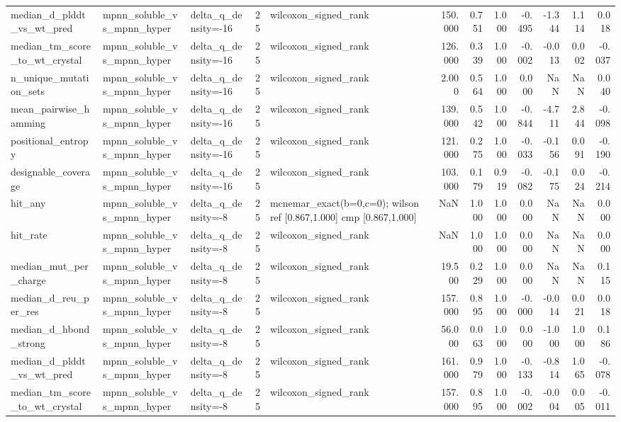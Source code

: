 \begin{table}
{\begin{tabular}{lllrlrrrrrrr}
median\_d\_plddt\_vs\_wt\_pred & mpnn\_soluble\_vs\_mpnn\_hyper & delta\_q\_density=-16 & 25 & wilcoxon\_signed\_rank & 150.000 & 0.751 & 1.000 & -0.495 & -1.344 & 1.114 & 0.018 \\
median\_tm\_score\_to\_wt\_crystal & mpnn\_soluble\_vs\_mpnn\_hyper & delta\_q\_density=-16 & 25 & wilcoxon\_signed\_rank & 126.000 & 0.339 & 1.000 & -0.002 & -0.013 & 0.002 & -0.037 \\
n\_unique\_mutation\_sets & mpnn\_soluble\_vs\_mpnn\_hyper & delta\_q\_density=-16 & 25 & wilcoxon\_signed\_rank & 2.000 & 0.564 & 1.000 & 0.000 & NaN & NaN & 0.040 \\
mean\_pairwise\_hamming & mpnn\_soluble\_vs\_mpnn\_hyper & delta\_q\_density=-16 & 25 & wilcoxon\_signed\_rank & 139.000 & 0.542 & 1.000 & -0.844 & -4.711 & 2.844 & -0.098 \\
positional\_entropy & mpnn\_soluble\_vs\_mpnn\_hyper & delta\_q\_density=-16 & 25 & wilcoxon\_signed\_rank & 121.000 & 0.275 & 1.000 & -0.033 & -0.156 & 0.091 & -0.190 \\
designable\_coverage & mpnn\_soluble\_vs\_mpnn\_hyper & delta\_q\_density=-16 & 25 & wilcoxon\_signed\_rank & 103.000 & 0.179 & 0.919 & -0.082 & -0.175 & 0.024 & -0.214 \\
hit\_any & mpnn\_soluble\_vs\_mpnn\_hyper & delta\_q\_density=-8 & 25 & mcnemar\_exact(b=0,c=0); wilson ref [0.867,1.000] cmp [0.867,1.000] & NaN & 1.000 & 1.000 & 0.000 & NaN & NaN & 0.000 \\
hit\_rate & mpnn\_soluble\_vs\_mpnn\_hyper & delta\_q\_density=-8 & 25 & wilcoxon\_signed\_rank & NaN & 1.000 & 1.000 & 0.000 & NaN & NaN & 0.000 \\
median\_mut\_per\_charge & mpnn\_soluble\_vs\_mpnn\_hyper & delta\_q\_density=-8 & 25 & wilcoxon\_signed\_rank & 19.500 & 0.229 & 1.000 & 0.000 & NaN & NaN & 0.115 \\
median\_d\_reu\_per\_res & mpnn\_soluble\_vs\_mpnn\_hyper & delta\_q\_density=-8 & 25 & wilcoxon\_signed\_rank & 157.000 & 0.895 & 1.000 & -0.000 & -0.014 & 0.021 & 0.018 \\
median\_d\_hbond\_strong & mpnn\_soluble\_vs\_mpnn\_hyper & delta\_q\_density=-8 & 25 & wilcoxon\_signed\_rank & 56.000 & 0.063 & 1.000 & 0.000 & -1.000 & 1.000 & 0.186 \\
median\_d\_plddt\_vs\_wt\_pred & mpnn\_soluble\_vs\_mpnn\_hyper & delta\_q\_density=-8 & 25 & wilcoxon\_signed\_rank & 161.000 & 0.979 & 1.000 & -0.133 & -0.814 & 1.065 & -0.078 \\
median\_tm\_score\_to\_wt\_crystal & mpnn\_soluble\_vs\_mpnn\_hyper & delta\_q\_density=-8 & 25 & wilcoxon\_signed\_rank & 157.000 & 0.895 & 1.000 & -0.002 & -0.004 & 0.005 & -0.011 \\

\end{tabular}}
\end{table}
